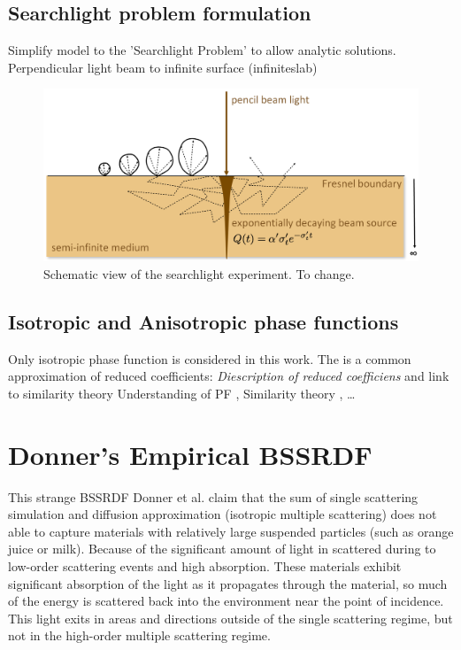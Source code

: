 \subsection{Searchlight problem formulation}
\label{section:searchlight}
Simplify model to the 'Searchlight Problem' to allow analytic solutions.
Perpendicular light beam to infinite surface \cite{Jacques1995}
(\gls{infiniteslab}) \begin{figure}[h]
    \centering
    \includegraphics[width=\textwidth]{imgs/schemes/searchlight_disney}
    \caption{Schematic view of the searchlight experiment. To change.}
    \label{fig:searchlight_scheme}
\end{figure}

\subsection{Isotropic and Anisotropic phase functions}
\label{section:phasefunction_approximation}
Only isotropic phase function is considered in this work. The is a common approximation of reduced
coefficients:
\emph{Diescription of reduced coefficiens} and link to similarity theory
Understanding of PF \cite{Gkioulekas:2013:URP:2516971.2516972}, Similarity theory
\cite{Zhao:2014:HSR:2601097.2601104}, \cite{Gkioulekas:2013:IVR:2508363.2508377}
\ldots

\section{Donner's Empirical BSSRDF}
This strange \gls{BSSRDF}
Donner et al. \cite{Donner:2009:EBM} claim that the sum of single scattering
simulation and diffusion approximation (isotropic multiple scattering) does not
able to capture materials with relatively large suspended particles (such as
orange juice or milk). Because of the significant amount of light in scattered
during to low-order scattering events and high absorption.
These materials exhibit significant absorption of the light as it propagates
through the material, so much of the energy is scattered back into
the environment near the point of incidence. This light exits in areas and
directions outside of the single scattering regime, but not in the high-order
multiple scattering regime.


